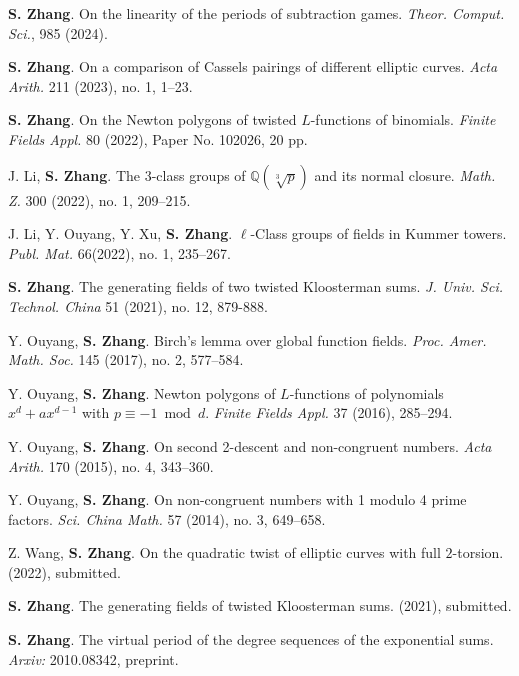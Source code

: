 \documentclass[11pt]{article}
\begin{document}
\newpage
{}
\begin{cvlist}
	\item \textbf{S. Zhang}.
	On the linearity of the periods of subtraction games.
	{\em Theor. Comput. Sci.}, 985 (2024).
	
	\item \textbf{S. Zhang}.
	On a comparison of Cassels pairings of different elliptic curves.
	{\em Acta Arith.} 211 (2023), no. 1, 1--23.

	\item \textbf{S. Zhang}.
	On the Newton polygons of twisted $L$-functions of binomials.
	{\em Finite Fields Appl.} 80 (2022), Paper No. 102026, 20 pp.

	\item J. Li, \textbf{S. Zhang}.
	The $3$-class groups of $\mathbb{Q}(\sqrt[3]{p})$ and its normal closure.
	{\em Math. Z.} 300 (2022), no. 1, 209--215.

	\item J. Li, Y. Ouyang, Y. Xu, \textbf{S. Zhang}.
	$\ell$-Class groups of fields in Kummer towers.
	{\em Publ. Mat.} 66(2022), no. 1, 235--267.

	\item \textbf{S. Zhang}.
	The generating fields of two twisted Kloosterman sums.
	{\em J. Univ. Sci. Technol. China} 51 (2021), no. 12, 879-888.

	\item Y. Ouyang, \textbf{S. Zhang}.
	Birch's lemma over global function fields.
	{\em Proc. Amer. Math. Soc.} 145 (2017), no. 2, 577--584.

	\item Y. Ouyang, \textbf{S. Zhang}.
	Newton polygons of $L$-functions of polynomials $x^d+ax^{d-1}$ with $p\equiv -1 \bmod d$.
	{\em Finite Fields Appl.} 37 (2016), 285--294.

	\item Y. Ouyang, \textbf{S. Zhang}.
	On second 2-descent and non-congruent numbers.
	{\em Acta Arith.} 170 (2015), no. 4, 343--360.

	\item Y. Ouyang, \textbf{S. Zhang}.
	On non-congruent numbers with 1 modulo 4 prime factors.
	{\em Sci. China Math.} 57 (2014), no. 3, 649--658.
	\end{cvlist}


	\begin{cvlist}
	\item Z. Wang, \textbf{S. Zhang}.
	On the quadratic twist of elliptic curves with full $2$-torsion.
	(2022), submitted.

	\item \textbf{S. Zhang}.
	The generating fields of twisted Kloosterman sums.
	(2021), submitted.

	\item \textbf{S. Zhang}.
	The virtual period of the degree sequences of the exponential sums.
	{\em Arxiv:} 2010.08342, preprint.
\end{cvlist}
\end{document}
